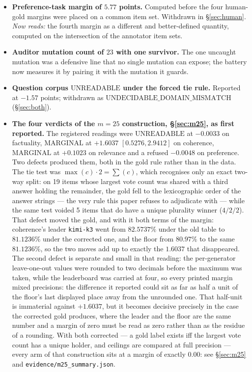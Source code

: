\documentclass{article}
\newcommand{\ids}[1]{\texttt{\small #1}} %
\begin{document}
\begin{itemize}
\S\ref{sec:sweep}. \emph{Now reads:} the five-seed sweep of \S\ref{sec:sweep}, with the ordering recovered in
all five at the top rank and the full ordering in four.
\item \textbf{Preference-task margin of $5.77$ points.} Computed before the four
human-gold margins were placed on a common item set. Withdrawn in
\S\ref{sec:human}. \emph{Now reads:} the fourth margin as a different and better-defined quantity, computed on
the intersection of the annotator item sets.
\item \textbf{Auditor mutation count of $23$ with one survivor.} The one
uncaught mutation was a defensive line that no single mutation can expose; the
battery now measures it by pairing it with the mutation it guards.
\item \textbf{Question corpus $\mathrm{UNREADABLE}$ under the forced tie rule.} Reported at $-1.57$ points; withdrawn as $\mathrm{UNDECIDABLE\_DOMAIN\_MISMATCH}$ (\S\ref{sec:both}).
\item \textbf{The four verdicts of the $m=25$ construction, \S\ref{sec:m25}, as first reported.} The registered readings were $\mathrm{UNREADABLE}$ at $-0.0033$ on factuality, $\mathrm{MARGINAL}$ at $+1.6037$ $[0.5276,2.9412]$ on coherence, $\mathrm{MARGINAL}$ at $+0.1023$ on relevance and a refused $-0.0048$ on preference. Two defects produced them, both in the gold rule rather than in the data. The tie test was $\max(c)\cdot 2 = \sum(c)$, which recognises only an exact two-way split: on 19 items whose largest vote count was shared with a third answer holding the remainder, the gold fell to the lexicographic order of the answer strings --- the very rule this paper refuses to adjudicate with --- while the same test voided 5 items that do have a unique plurality winner ($4/2/2$). That defect moved the gold, and with it both terms of the margin: coherence's leader \ids{kimi-k3} went from $82.5737\%$ under the old table to $81.1236\%$ under the corrected one, and the floor from $80.97\%$ to the same $81.1236\%$, so the two moves add up to exactly the $1.6037$ that disappeared. The second defect is separate and small in that reading: the per-generator leave-one-out values were rounded to two decimals before the maximum was taken, while the leaderboard was carried at four, so every printed margin mixed precisions: the difference it reported could sit as far as half a unit of the floor's last displayed place away from the unrounded one. That half-unit is immaterial against $+1.6037$, but it becomes decisive precisely in the case the corrected gold produces, where the leader and the floor are the same number and a margin of zero must be read as zero rather than as the residue of a rounding. With both corrected --- a gold label exists iff the largest vote count has a unique holder, and ceilings are compared at full precision --- every arm of that construction sits at a margin of exactly $0.00$: see \S\ref{sec:m25} and \ids{evidence/m25\_summary.json}.

\end{itemize}
\end{document}
